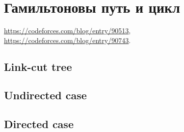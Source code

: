 \section{Гамильтоновы путь и цикл}
\underline{\url{https://codeforces.com/blog/entry/90513}},
\underline{\url{https://codeforces.com/blog/entry/90743}}.
\subsection{Link-cut tree}

\subsection{Undirected case}

\subsection{Directed case}

